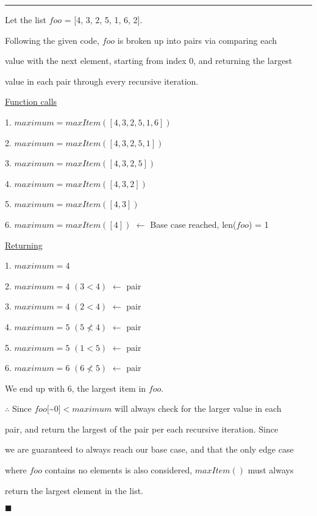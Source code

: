 \documentclass{article}
\begin{document}
\hrule

\vspace{0.5cm}

Let the list $foo$ = [4, 3, 2, 5, 1, 6, 2].

\vspace{0.5cm}

Following the given code, $foo$ is broken up into pairs via comparing each 

value with the next element, starting from index 0, and returning the largest 

value in each pair through every recursive iteration.

\vspace{0.5cm}

\underline{Function calls}

1. $maximum = maxItem([4,3,2,5,1,6])$

2. $maximum = maxItem([4,3,2,5,1])$

3. $maximum = maxItem([4,3,2,5])$

4. $maximum = maxItem([4,3,2])$

5. $maximum = maxItem([4,3])$

6. $maximum = maxItem([4])$ $\leftarrow$ Base case reached, len($foo$) = 1

\vspace{0.5cm}

\underline{Returning}


1. $maximum = 4$

2. $maximum = 4$ $(3 < 4)$ $\leftarrow$ pair

3. $maximum = 4$ $(2 < 4)$ $\leftarrow$ pair

4. $maximum = 5$ $(5 \not < 4)$ $\leftarrow$ pair

5. $maximum = 5$ $(1 < 5)$ $\leftarrow$ pair

6. $maximum = 6$ $(6 \not < 5)$  $\leftarrow$ pair

\vspace{0.5cm}

We end up with 6, the largest item in $foo$.

\vspace{0.2cm}

$\therefore$ Since $foo[$\textasciitilde{}$0] < maximum$ will always check for the larger value in each 

pair, and return the largest of the pair per each recursive iteration. Since 

we are guaranteed to always reach our base case, and that the only edge case 

where $foo$ contains no elements is also considered, $maxItem()$ must always

return the largest element in the list.

$\blacksquare$
\end{document}

